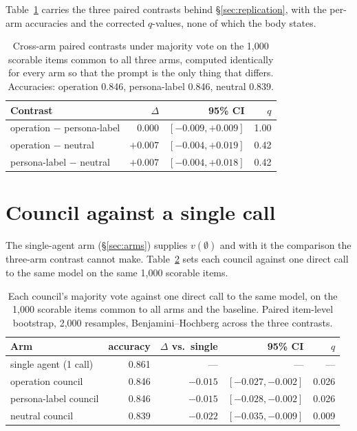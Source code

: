 Table~\ref{tab:cross-arm} carries the three paired contrasts behind \S\ref{sec:replication}, with the
per-arm accuracies and the corrected $q$-values, none of which the body states.

\begin{table}[h]
\centering
\small
\begin{tabular}{lrrr}
\toprule
Contrast & $\Delta$ & 95\% CI & $q$ \\
\midrule
operation $-$ persona-label & $0.000$  & $[-0.009, +0.009]$ & 1.00 \\
operation $-$ neutral       & $+0.007$ & $[-0.004, +0.019]$ & 0.42 \\
persona-label $-$ neutral   & $+0.007$ & $[-0.004, +0.018]$ & 0.42 \\
\bottomrule
\end{tabular}
\caption{Cross-arm paired contrasts under majority vote on the 1,000 scorable items common to all
three arms, computed identically for every arm so that the prompt is the only thing that differs.
Accuracies: operation 0.846, persona-label 0.846, neutral 0.839.}
\label{tab:cross-arm}
\end{table}

\section{Council against a single call}
\label{app:single-call}

The single-agent arm (\S\ref{sec:arms}) supplies $v(\emptyset)$ and with it the comparison the
three-arm contrast cannot make. Table~\ref{tab:single-call} sets each council against one direct call
to the same model on the same 1,000 scorable items.

\begin{table}[h]
\centering
\small
\begin{tabular}{lrrrr}
\toprule
Arm & accuracy & $\Delta$ vs.\ single & 95\% CI & $q$ \\
\midrule
single agent (1 call)   & 0.861 & ---       & ---                & --- \\
operation council       & 0.846 & $-0.015$  & $[-0.027, -0.002]$ & 0.026 \\
persona-label council   & 0.846 & $-0.015$  & $[-0.028, -0.002]$ & 0.026 \\
neutral council         & 0.839 & $-0.022$  & $[-0.035, -0.009]$ & 0.009 \\
\bottomrule
\end{tabular}
\caption{Each council's majority vote against one direct call to the same model, on the 1,000
scorable items common to all arms and the baseline. Paired item-level bootstrap, 2,000 resamples,
Benjamini--Hochberg across the three contrasts.}
\label{tab:single-call}
\end{table}

